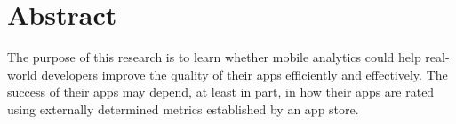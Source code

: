\chapter*{Abstract}
\begin{SingleSpace}
The purpose of this research is to learn whether mobile analytics could help
real-world developers improve the quality of their apps efficiently and effectively. The success of their apps may depend, at least in part, in how their apps are rated using externally determined metrics established by an app store.
%
%


\end{SingleSpace}
